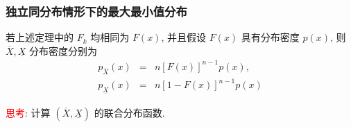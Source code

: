  \begin{frame}
 	\frametitle{独立同分布情形下的最大最小值分布}
 	\begin{coro}
 		若上述定理中的 $F_k$ 均相同为 $F (x)$, 并且假设 $F (x)$ 具有分布密度 $p (x)$, 则 $\overline{X},\underline{X}$ 分布密度分别为
 		\begin{eqnarray*}
 			p_{\overline{X}}(x)&=&n[F(x)]^{n-1}p(x),\\
 			p_{\underline{X}}(x)&=&n[1-F(x)]^{n-1}p(x)
 		\end{eqnarray*}
 	\end{coro}

 	\pause

 	\textcolor{red}{思考}: 计算 $(\overline{X},\underline{X})$ 的联合分布函数.

 \end{frame}

